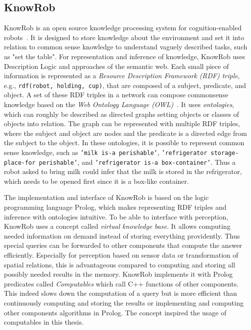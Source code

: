 \subsection{KnowRob}
\label{sec:knowrob}
KnowRob is an open source knowledge processing system for
cognition-enabled robots~\cite{KnowRob,KnowRob-Representation}. It is
designed to store knowledge about the environment and set it into
relation to common sense knowledge to understand vaguely described
tasks, such as "set the table". For representation and inference of
knowledge, KnowRob uses Description Logic and approaches of the
semantic web.  Each small piece of information is represented as a
\emph{Resource Description Framework (RDF) triple}, e.g., \texttt{rdf(robot,
holding, cup)}, that are composed of a subject, predicate, and
object. A set of these RDF triples in a network can compose
commonsense knowledge based on the \emph{Web Ontology Language
  (OWL)}~\cite{owl}. It uses \emph{ontologies}, which can roughly be described as
directed graphs setting objects or classes of objects into
relation. The graph can be represented with multiple RDF triples,
where the subject and object are nodes and the predicate is a directed
edge from the subject to the object. In these ontologies, it is
possible to represent common sense knowledge, such as \texttt{'milk is-a
perishable'}, \texttt{'refrigerator storage-place-for perishable'}, and
\texttt{'refrigerator is-a box-container'}. Thus a robot asked to bring milk
could infer that the milk is stored in the refrigerator, which needs
to be opened first since it is a box-like container.

The implementation and interface of KnowRob is based on the logic
programming language Prolog, which makes representing RDF triples and
inference with ontologies intuitive.  To be able to interface with
perception, KnowRob uses a concept called \emph{virtual knowledge
  base}. It allows computing needed information on demand instead of
storing everything providently. Thus special queries can be forwarded
to other components that compute the answer efficiently.  Especially
for perception based on sensor data or transformation of spatial
relations, this is advantageous compared to computing and storing all
possibly needed results in the memory.  KnowRob implements it with
Prolog predicates called \emph{Computables} which call C++ functions
of other components. This indeed slows down the computation of a query
but is more efficient than continuously computing and storing the
results or implementing and computing other components algorithms in
Prolog.  The concept inspired the usage of computables in this thesis.

